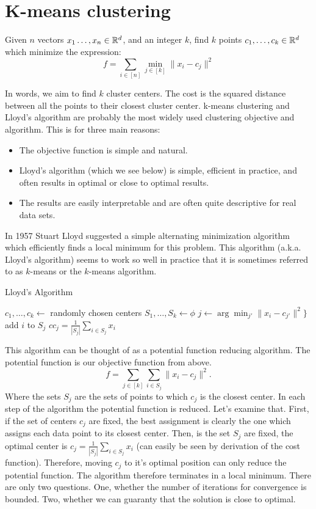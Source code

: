 \documentclass{article}
\begin{document}

\section{K-means clustering}
\begin{definition}[$k$-means]
Given $n$ vectors $x_1\ldots,x_n\in {\mathbb{R}}^d$, and an integer $k$, find $k$ points $c_1,\ldots,c_k \in {\mathbb{R}}^d$
which minimize the expression:
\[
f = \sum_{i \in [n]} \min_{j \in [k]} \|x_i - c_j \|^2
\]
\end{definition}
In words, we aim to find $k$ cluster centers. The cost is the squared distance between all the points to their closest cluster center.
k-means clustering and Lloyd's algorithm \cite{Lloyd82leastsquares} are probably the most widely used clustering objective and algorithm.
This is for three main reasons:
\begin{itemize} 
\item The objective function is simple and natural.
\item Lloyd's algorithm (which we see below) is simple, efficient in practice, and often results in optimal or close to optimal results.
\item The results are easily interpretable and are often quite descriptive for real data sets. 
\end{itemize}
In 1957 Stuart Lloyd suggested a simple alternating minimization algorithm which efficiently finds a local minimum for this problem.
This algorithm (a.k.a. Lloyd's algorithm) seems to work so well in practice that it is sometimes referred to as $k$-means or the $k$-means algorithm.

\begin{algorithm}
\caption{Lloyd's Algorithm}
\begin{algorithmic}
\STATE $c_1,\ldots,c_k \leftarrow$ randomly chosen centers
\STATE $S_1,\ldots,S_k \leftarrow \phi$
	\STATE $j \leftarrow \arg\min_{j'}\|x_i- c_{j'}\|^2 \}$
	\STATE add $i$ to $S_j$
\ENDFOR
{}
	\STATE $cc_j = \frac{1}{|S_j|}\sum_{i \in S_j} x_i$
\ENDFOR
\ENDWHILE
\end{algorithmic}
\end{algorithm}
\noindent This algorithm can be thought of as a potential function reducing algorithm.
The potential function is our objective function from above.
\[
f = \sum_{j \in [k]} \sum_{i \in S_j} \|x_i - c_j\|^2.
\]
Where the sets $S_j$ are the sets of points to which $c_j$ is the closest center.
In each step of the algorithm the potential function is reduced.
Let's examine that.
First, if the set of centers $c_j$ are fixed, the best assignment is clearly the one which assigns
each data point to its closest center. 
Then, is the set $S_j$ are fixed, the optimal center is $c_j = \frac{1}{|S_j|}\sum_{i \in S_j} x_i$ (can easily be seen by derivation of the cost function).
Therefore, moving $c_j$ to it's optimal position can only reduce the potential function. 
The algorithm therefore terminates in a local minimum.
There are only two questions. One, whether the number of iterations for convergence is bounded. Two, whether we can guaranty that the solution is close to optimal.
\end{document}
